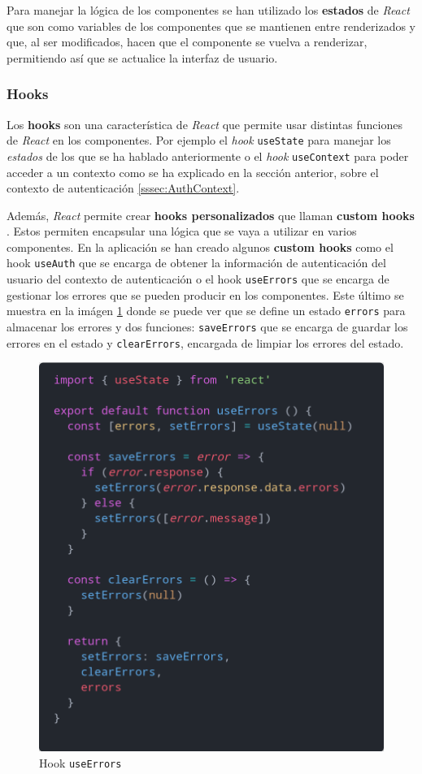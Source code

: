 Para manejar la lógica de los componentes se han utilizado los \textbf{estados} de
\textit{React} \cite{react-state} que son como variables de los componentes que se
mantienen entre renderizados y que, al ser modificados, hacen que el componente se
vuelva a renderizar, permitiendo así que se actualice la interfaz de usuario.

\subsubsection{Hooks}
Los \textbf{hooks} son una característica de \textit{React} \cite{react-hooks} que
permite usar distintas funciones de \textit{React} \cite{react} en los componentes.
Por ejemplo el \textit{hook} \texttt{useState} \cite{use-state} para manejar los
\textit{estados} de los que se ha hablado anteriormente o el \textit{hook}
\texttt{useContext} \cite{use-context} para poder acceder a un contexto como se ha
explicado en la sección anterior, sobre el contexto de autenticación \ref{sssec:AuthContext}.

Además, \textit{React} \cite{react} permite crear \textbf{hooks personalizados} que
llaman \textbf{custom hooks} \cite{custom-hooks}. Estos permiten encapsular una lógica
que se vaya a utilizar en varios componentes. En la aplicación se han creado algunos
\textbf{custom hooks} como el hook \texttt{useAuth} que se encarga de obtener la
información de autenticación del usuario del contexto de autenticación o el hook
\texttt{useErrors} que se encarga de gestionar los errores que se pueden producir en los
componentes. Este último se muestra en la imágen \ref{fig:use-errors} donde se puede ver
que se define un estado \texttt{errors} para almacenar los errores y dos funciones:
\texttt{saveErrors} que se encarga de guardar los errores en el estado y \texttt{clearErrors},
encargada de limpiar los errores del estado.

\begin{figure}[H]
  \centering
  \includegraphics[width=\textwidth]{img/use-errors}
  \caption{Hook \texttt{useErrors}}
  \label{fig:use-errors}
\end{figure}
